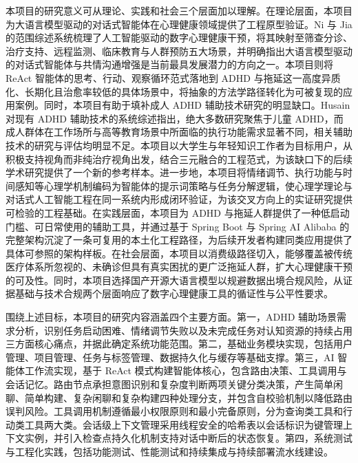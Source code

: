 \par 本项目的研究意义可从理论、实践和社会三个层面加以理解。在理论层面，本项目为大语言模型驱动的对话式智能体在心理健康领域提供了工程原型验证。Ni 与 Jia 的范围综述系统梳理了人工智能驱动的数字心理健康干预，将其映射至筛查分诊、治疗支持、远程监测、临床教育与人群预防五大场景，并明确指出大语言模型驱动的对话式智能体与共情沟通增强是当前最具发展潜力的方向之一\cite{ni2026scoping}。本项目则将 ReAct 智能体的思考、行动、观察循环范式落地到 ADHD 与拖延这一高度异质化、长期化且治愈率较低的具体场景中，将抽象的方法学路径转化为可被复现的应用案例。同时，本项目有助于填补成人 ADHD 辅助技术研究的明显缺口。Husain 对现有 ADHD 辅助技术的系统综述指出，绝大多数研究聚焦于儿童 ADHD，而成人群体在工作场所与高等教育场景中所面临的执行功能需求显著不同，相关辅助技术的研究与评估均明显不足\cite{husain2020investigating}。本项目以大学生与年轻知识工作者为目标用户，从积极支持视角而非纯治疗视角出发，结合三元融合的工程范式，为该缺口下的后续学术研究提供了一个新的参考样本。进一步地，本项目将情绪调节、执行功能与时间感知等心理学机制编码为智能体的提示词策略与任务分解逻辑，使心理学理论与对话式人工智能工程在同一系统内形成闭环验证，为该交叉方向上的实证研究提供可检验的工程基础。在实践层面，本项目为 ADHD 与拖延人群提供了一种低启动门槛、可日常使用的辅助工具，并通过基于 Spring Boot 与 Spring AI Alibaba 的完整架构沉淀了一条可复用的本土化工程路径，为后续开发者构建同类应用提供了具体可参照的架构样板。在社会层面，本项目以消费级路径切入，能够覆盖被传统医疗体系所忽视的、未确诊但具有真实困扰的更广泛拖延人群，扩大心理健康干预的可及性\cite{catala2020digital}。同时，本项目选择国产开源大语言模型以规避数据出境合规风险，从证据基础与技术合规两个层面响应了数字心理健康工具的循证性与公平性要求\cite{mohammed2023technology}。

\par 围绕上述目标，本项目的研究内容涵盖四个主要方面。第一，ADHD 辅助场景需求分析，识别任务启动困难、情绪调节失败以及未完成任务对认知资源的持续占用三方面核心痛点，并据此确定系统功能范围。第二，基础业务模块实现，包括用户管理、项目管理、任务与标签管理、数据持久化与缓存等基础支撑。第三，AI 智能体工作流实现，基于 ReAct 模式构建智能体核心，包含路由决策、工具调用与会话记忆。路由节点承担意图识别和复杂度判断两项关键分类决策，产生简单闲聊、简单构建、复杂闲聊和复杂构建四种处理分支，并包含自校验机制以降低路由误判风险。工具调用机制遵循最小权限原则和最小完备原则，分为查询类工具和行动类工具两大类。会话级上下文管理采用线程安全的哈希表以会话标识为键管理上下文实例，并引入检查点持久化机制支持对话中断后的状态恢复。第四，系统测试与工程化实践，包括功能测试、性能测试和持续集成与持续部署流水线建设。

